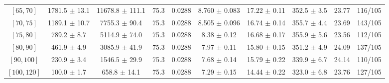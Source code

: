 \begin{tabular}{c||c|c|c|c|c|c|c||c|c}
$[65, 70]$ & 1781.5 $\pm$ 13.1 & 11678.8 $\pm$ 111.1 & 75.3 & 0.0288 & 8.760 $\pm$ 0.083 & 17.22 $\pm$ 0.11 & 352.5 $\pm$ 3.5 & 23.77 & 116/105\\
$[70, 75]$ & 1189.1 $\pm$ 10.7 & 7755.3 $\pm$ 90.4 & 75.3 & 0.0288 & 8.505 $\pm$ 0.096 & 16.74 $\pm$ 0.14 & 355.7 $\pm$ 4.4 & 23.69 & 143/105\\
$[75, 80]$ & 789.2 $\pm$ 8.7 & 5114.9 $\pm$ 74.0 & 75.3 & 0.0288 & 8.38 $\pm$ 0.12 & 16.68 $\pm$ 0.17 & 355.9 $\pm$ 5.6 & 23.56 & 112/105\\
$[80, 90]$ & 461.9 $\pm$ 4.9 & 3085.9 $\pm$ 41.9 & 75.3 & 0.0288 & 7.97 $\pm$ 0.11 & 15.80 $\pm$ 0.15 & 351.2 $\pm$ 4.9 & 24.09 & 137/105\\
$[90, 100]$ & 230.9 $\pm$ 3.4 & 1546.5 $\pm$ 29.9 & 75.3 & 0.0288 & 7.68 $\pm$ 0.14 & 15.79 $\pm$ 0.22 & 339.9 $\pm$ 6.7 & 24.14 & 110/105\\
$[100, 120]$ & 100.0 $\pm$ 1.7 & 658.8 $\pm$ 14.1 & 75.3 & 0.0288 & 7.29 $\pm$ 0.15 & 14.44 $\pm$ 0.22 & 323.0 $\pm$ 6.8 & 23.76 & 127/105\\
\end{tabular}
